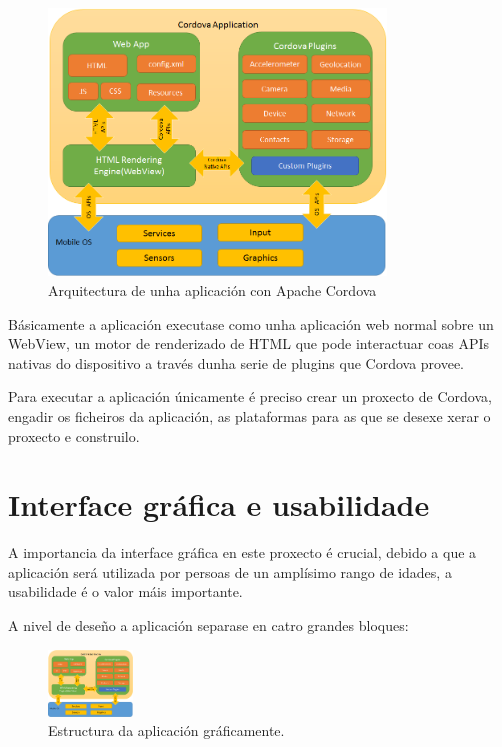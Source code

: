     \begin{figure}[h!]
      \begin{center}
      \includegraphics[width=0.8\textwidth]{./img/cordova_arquitectura.png}
      \caption{Arquitectura de unha aplicación con Apache Cordova}
      \end{center}
    \end{figure}

  Básicamente a aplicación executase como unha aplicación web normal sobre un 
WebView, un motor de renderizado de HTML que pode interactuar coas APIs nativas 
do dispositivo a través dunha serie de plugins que Cordova provee.

  Para executar a aplicación únicamente é preciso crear un proxecto de Cordova, 
engadir os ficheiros da aplicación, as plataformas para as que se desexe xerar 
o proxecto e construilo.

  \section{Interface gráfica e usabilidade}
  A importancia da interface gráfica en este proxecto é crucial, debido a que a 
aplicación será utilizada por persoas de un amplísimo rango de idades, a 
usabilidade é o valor máis importante.

  A nivel de deseño a aplicación separase en catro grandes bloques:

  \begin{figure}[h!]
    \begin{center}
    \includegraphics[width=0.2\textwidth]{./img/cordova_arquitectura.png}
    \caption{Estructura da aplicación gráficamente.}
    \end{center}
  \end{figure}

